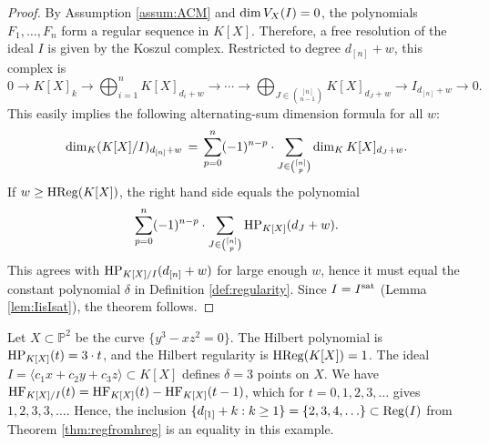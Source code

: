 \documentclass[12pt]{article}
\theoremstyle{definition}
\newenvironment{example}
  {\pushQED{\qed}\renewcommand{\qedsymbol}{$\diamond$}\examplex}
  {\popQED\endexamplex}
\theoremstyle{remark}
\begin{document}
\begin{proof}
    By Assumption \ref{assum:ACM} and ${\rm dim} \, V_X(I) = 0$, the polynomials $F_1, \ldots, F_n$ form a regular sequence in $K[X]$. Therefore, a free resolution of the ideal $I$ is given by the Koszul complex. Restricted to degree $d_{[n]} + w$, this complex is
    \begin{equation} \label{eq:koszulACM}
    0 \rightarrow K[X]_k \rightarrow \bigoplus_{i=1}^n K[X]_{d_i+w}  \rightarrow  
    \cdots \rightarrow \bigoplus_{J \in \binom{[n]}{n-1}} K[X]_{d_J+w}
    \rightarrow I_{d_{[n]} + w} \rightarrow 0.
    \end{equation}
    This easily implies the following alternating-sum dimension formula for all $w$:
    \[ {\rm dim}_K (K[X]/I)_{d_{[n]}+w} \, = \, \sum_{p= 0}^n (-1)^{n-p} \cdot \sum_{J \in \binom{[n]}{p}} \dim_K K[X]_{d_J + w}. \]
    If $w \geq {\rm HReg}(K[X])$, the right hand side equals the polynomial
    \[ \sum_{p= 0}^n (-1)^{n-p} \cdot \sum_{J \in \binom{[n]}{p}} {\rm HP}_{K[X]}(d_J + w). \]
    This agrees with ${\rm HP}_{K[X]/I}(d_{[n]} + w)$ for large enough $w$, hence it must equal the constant polynomial $\delta$ in Definition \ref{def:regularity}. Since $I = I^{\rm sat}$ (Lemma \ref{lem:IisIsat}), the theorem follows. 
\end{proof}

\begin{example}
Let $X \subset \mathbb{P}^2$ be the curve $\{y^3-xz^2 = 0 \}$. The Hilbert polynomial is ${\rm HP}_{K[X]}(t) = 3 \cdot t$, and the Hilbert regularity is ${\rm HReg}(K[X]) = 1$. The ideal $I = \langle c_1 x + c_2 y + c_3 z \rangle \subset K[X]$ defines $\delta = 3$ points on $X$. We have ${\rm HF}_{K[X]/I}(t) = {\rm HF}_{K[X]}(t) - {\rm HF}_{K[X]}(t-1)$, which for $t = 0, 1, 2, 3,\ldots$ gives $1, 2, 3, 3, \ldots$. Hence, the inclusion $\{ d_{[1]} + k : k \geq 1 \} = \{2,3,4,\ldots \} \subset {\rm Reg}(I)$ from Theorem \ref{thm:regfromhreg} is an equality in this example. 
\end{example}
\end{document}
